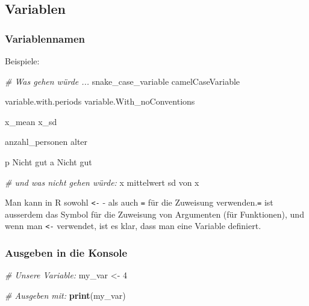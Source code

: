 \documentclass[
]{article}
\newenvironment{Shaded}{\begin{snugshade}}{\end{snugshade}}
\newcommand{\CommentTok}[1]{\textcolor[rgb]{0.56,0.35,0.01}{\textit{#1}}}
\newcommand{\DecValTok}[1]{\textcolor[rgb]{0.00,0.00,0.81}{#1}}
\newcommand{\FunctionTok}[1]{\textcolor[rgb]{0.13,0.29,0.53}{\textbf{#1}}}
\newcommand{\NormalTok}[1]{#1}
\newcommand{\OtherTok}[1]{\textcolor[rgb]{0.56,0.35,0.01}{#1}}
\begin{document}
\hypertarget{variablen}{%
\subsection{Variablen}\label{variablen}}

\hypertarget{variablennamen}{%
\subsubsection{Variablennamen}\label{variablennamen}}

Beispiele:

\begin{Shaded}
\begin{Highlighting}[]
\CommentTok{\# Was gehen würde ...}
\NormalTok{snake\_case\_variable}
\NormalTok{camelCaseVariable}

\NormalTok{variable.with.periods}
\NormalTok{variable.With\_noConventions}

\NormalTok{x\_mean}
\NormalTok{x\_sd}

\NormalTok{anzahl\_personen}
\NormalTok{alter}

\NormalTok{p                       Nicht gut}
\NormalTok{a                       Nicht gut}

\CommentTok{\# und was nicht gehen würde:}
\NormalTok{x mittelwert}
\NormalTok{sd von x}
\end{Highlighting}
\end{Shaded}

Man kann in R sowohl \texttt{\textless{}-} - als auch \texttt{=} für die
Zuweisung verwenden.\texttt{=} ist ausserdem das Symbol für die
Zuweisung von Argumenten (für Funktionen), und wenn man
\texttt{\textless{}-} verwendet, ist es klar, dass man eine Variable
definiert.

\hypertarget{ausgeben-in-die-konsole}{%
\subsubsection{Ausgeben in die Konsole}\label{ausgeben-in-die-konsole}}

\begin{Shaded}
\begin{Highlighting}[]
\CommentTok{\# Unsere Variable:}
\NormalTok{my\_var }\OtherTok{\textless{}{-}} \DecValTok{4}

\CommentTok{\# Ausgeben mit:}
\FunctionTok{print}\NormalTok{(my\_var)}
\end{Highlighting}
\end{Shaded}
\end{document}
